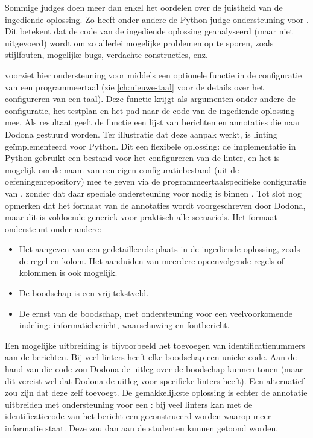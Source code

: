 Sommige judges doen meer dan enkel het oordelen over de juistheid van de ingediende oplossing.
Zo heeft onder andere de Python-judge ondersteuning voor .
Dit betekent dat de code van de ingediende oplossing geanalyseerd (maar niet uitgevoerd) wordt om zo allerlei mogelijke problemen op te sporen, zoals stijlfouten, mogelijke bugs, verdachte constructies, enz.

\tested{} voorziet hier ondersteuning voor middels een optionele functie in de configuratie van een programmeertaal (zie \cref{ch:nieuwe-taal} voor de details over het configureren van een taal).
Deze functie krijgt als argumenten onder andere de configuratie, het testplan en het pad naar de code van de ingediende oplossing mee.
Als resultaat geeft de functie een lijst van berichten en annotaties die naar Dodona gestuurd worden.
Ter illustratie dat deze aanpak werkt, is linting geïmplementeerd voor Python.
Dit een flexibele oplossing: de implementatie in Python gebruikt een bestand voor het configureren van de linter, en het is mogelijk om de naam van een eigen configuratiebestand (uit de oefeningenrepository) mee te geven via de programmeertaalspecifieke configuratie van \tested{}, zonder dat daar speciale ondersteuning voor nodig is binnen \tested{}.
Tot slot nog opmerken dat het formaat van de annotaties wordt voorgeschreven door Dodona, maar dit is voldoende generiek voor praktisch alle scenario's.
Het formaat ondersteunt onder andere:

\begin{itemize}
    \item Het aangeven van een gedetailleerde plaats in de ingediende oplossing, zoals de regel en kolom.
    Het aanduiden van meerdere opeenvolgende regels of kolommen is ook mogelijk.
    \item De boodschap is een vrij tekstveld.
    \item De ernst van de boodschap, met ondersteuning voor een veelvoorkomende indeling: informatiebericht, waarschuwing en foutbericht.
\end{itemize}

Een mogelijke uitbreiding is bijvoorbeeld het toevoegen van identificatienummers aan de berichten.
Bij veel linters heeft elke boodschap een unieke code.
Aan de hand van die code zou Dodona de uitleg over de boodschap kunnen tonen (maar dit vereist wel dat Dodona de uitleg voor specifieke linters heeft).
Een alternatief zou zijn dat \tested{} deze zelf toevoegt.
De gemakkelijkste oplossing is echter de annotatie uitbreiden met ondersteuning voor een : bij veel linters kan met de identificatiecode van het bericht een  geconstrueerd worden waarop meer informatie staat.
Deze  zou dan aan de studenten kunnen getoond worden.

